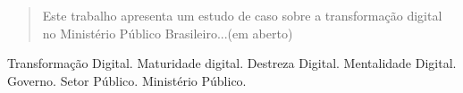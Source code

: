 \begin{abstract}
	Este trabalho apresenta um estudo de caso sobre a transformação digital no Ministério Público Brasileiro...(em aberto)
\end{abstract}

\begin{IEEEkeywords}
	Transformação Digital. Maturidade digital. Destreza Digital. Mentalidade Digital. Governo. Setor Público. Ministério Público.
\end{IEEEkeywords}
